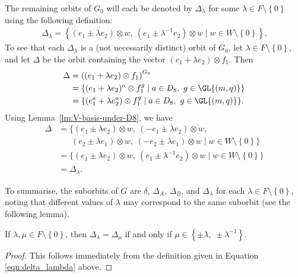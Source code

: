 The remaining orbits of $G_0$ will each be denoted by $\Delta_\lambda$ for some $\lambda \in F \setminus \left\{0 \right\}$ using the following definition:
\begin{align} \label{eqn:delta_lambda}
\Delta_\lambda = {\left\{\left(e_1 \pm \lambda e_2 \right) \otimes w,\ \left(e_1 \pm \lambda^{-1} e_2 \right) \otimes w \mid w \in W \setminus \left\{0 \right\}\right\}}.
\end{align}
To see that each $\Delta_\lambda$ is a (not necessarily distinct) orbit of $G_0$, let $\lambda \in F \setminus \left\{0 \right\}$, and let $\Delta$ be the orbit containing the vector $\left(e_1 + \lambda e_2 \right) \otimes f_1$. Then
\begin{align*}
\Delta &= \left(\left(e_1 + \lambda e_2 \right) \otimes f_1 \right)^{G_0} \\
&= \left\{(e_1 + \lambda e_2)^a \otimes f_1^g \mid a \in D_8,\ g \in \GL{\left(m, q \right)}\right\} \\
&= {\left\{(e_1^a + \lambda e_2^a) \otimes f_1^g \mid a \in D_8,\ g \in \GL{\left(m, q \right)}\right\}}.
\end{align*}
Using Lemma~\ref{lm:V-basis-under-D8}, we have
\begin{align*}
\Delta &= \big\{{\left(e_1 \pm \lambda e_2 \right)} \otimes w,\ \left(-e_1 \pm \lambda e_2 \right) \otimes w, \\
&\ \ \ \ \ \ \ \left(e_2 \pm \lambda e_1 \right) \otimes w,\ \left(-e_2 \pm \lambda e_1 \right) \otimes w \mid w \in W \setminus {\left\{0 \right\}}\big\} \\
&= \big\{{\left(e_1 \pm \lambda e_2 \right)} \otimes w,\ \left(e_1 \pm \lambda^{-1} e_2 \right) \otimes w \mid w \in W \setminus {\left\{0 \right\}}\big\} \\
&= \Delta_\lambda.
\end{align*}

To summarise, the suborbits of $G$ are $\delta$, $\Delta_A$, $\Delta_B$, and $\Delta_\lambda$ for each $\lambda \in F \setminus \left\{0 \right\}$, noting that different values of $\lambda$ may correspond to the same suborbit (see the following lemma).

\begin{lemma} \label{lm:suborbit-equivalence}
If $\lambda, \mu \in F \setminus \left\{0 \right\}$, then $\Delta_\lambda = \Delta_\mu$ if and only if $\mu \in \left\{\pm \lambda,\ \pm \lambda^{-1} \right\}$.
\end{lemma}
\begin{proof}
This follows immediately from the definition given in Equation \eqref{eqn:delta_lambda} above.
\end{proof}

